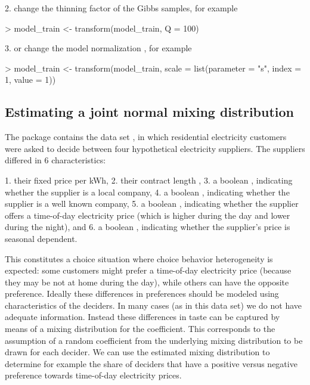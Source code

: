 \documentclass[article]{jss}
\begin{document}
2. change the thinning factor  of the Gibbs samples, for example
\begin{Schunk}
\begin{Sinput}
> model_train <- transform(model_train, Q = 100)
\end{Sinput}
\end{Schunk}

3. or change the model normalization , for example
\begin{Schunk}
\begin{Sinput}
> model_train <- transform(model_train, scale = list(parameter = "s", index = 1, value = 1))
\end{Sinput}
\end{Schunk}

\subsection{Estimating a joint normal mixing distribution} \label{subsec:normal_mix}

The  package \citep{Croissant:2020} contains the data set , in which residential electricity customers were asked to decide between four hypothetical electricity suppliers. The suppliers differed in 6 characteristics:

1. their fixed price  per kWh,
2. their contract length ,
3. a boolean , indicating whether the supplier is a local company,
4. a boolean , indicating whether the supplier is a well known company,
5. a boolean , indicating whether the supplier offers a time-of-day electricity price (which is higher during the day and lower during the night), and
6. a boolean , indicating whether the supplier's price is seasonal dependent.

This constitutes a choice situation where choice behavior heterogeneity is expected: some customers might prefer a time-of-day electricity price (because they may be not at home during the day), while others can have the opposite preference. Ideally these differences in preferences should be modeled using characteristics of the deciders. In many cases (as in this data set) we do not have adequate information. Instead these differences in taste can be captured by means of a mixing distribution for the  coefficient. This corresponds to the assumption of a random coefficient from the underlying mixing distribution to be drawn for each decider. We can use the estimated mixing distribution to determine for example the share of deciders that have a positive versus negative preference towards time-of-day electricity prices.
\end{document}
